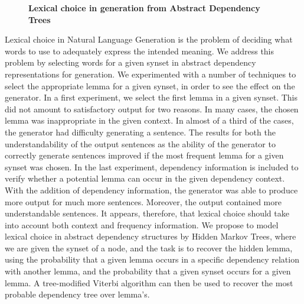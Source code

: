 \documentclass[10pt, a4paper, twopage, headinclude, footinclude, BCOR5mm]{scrartcl}
\begin{document}
\newpage

\begin{figure}[t!]
\centering
\large\textbf{Lexical choice in generation from Abstract Dependency Trees}
\vspace*{0.5cm}
\end{figure}


        \begin{table}[t!]
    \end{table}

\noindent
Lexical choice in Natural Language Generation is the problem of deciding what words to use to adequately express the intended meaning. We address this problem by selecting  words for a given synset in abstract dependency representations for generation. We experimented with a number of techniques to select the appropriate lemma for a given synset, in order to see the effect on the generator.  In a first experiment, we select the first lemma in a given synset. This did not amount to satisfactory output for two reasons. In many cases, the chosen lemma was inappropriate in the given context. In almost of a third of the cases, the generator had difficulty generating a sentence. The results for both the understandability of the output sentences as the ability of the generator to  correctly generate sentences improved if the most frequent lemma for a given synset was chosen. In the last experiment, dependency information is included to verify whether a potential lemma can occur in the given dependency context. With the addition of dependency information, the generator was able to produce more output for much more sentences. Moreover, the output contained more understandable sentences.  It appears, therefore, that lexical choice should take into account both context and frequency information. We propose to model lexical choice in abstract dependency structures by Hidden Markov Trees, where we are given the synset of a node, and the task is to recover the hidden lemma, using the probability that a given lemma occurs in a specific dependency relation with another lemma, and the probability that a given synset occurs for a given lemma. A tree-modified Viterbi algorithm can then be used to recover the most probable dependency tree over lemma's. 
\end{document}
